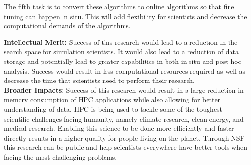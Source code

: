 \documentclass[12pt]{article}
\begin{document}
 The fifth task is to convert these algorithms to online algorithms so
that fine tuning can happen in situ. This will add flexibility for scientists
and decrease the computational demands of the algorithms. 


\textbf{Intellectual Merit:}
Success of this research would lead to a reduction in the search space for
simulation scientists. It would also lead to a reduction of data storage and
potentially lead to greater capabilities in both in situ and post hoc analysis. 
Success would result in less computational resources required as well as
decrease the time that scientists need to perform their research. 
%
\\\textbf{Broader Impacts:} 
Success of this research would result in a large reduction in memory consumption
of HPC applications while also allowing for better understanding of data. HPC is
being used to tackle some of the toughest scientific challenges facing humanity,
namely climate research, clean energy, and medical research. Enabling this
science to be done more efficiently and faster directly results in a higher
quality for people living on the planet. Through NSF this research can be public
and help scientists everywhere have better tools when facing the most
challenging problems.


\scriptsize


%
%
\end{document}
